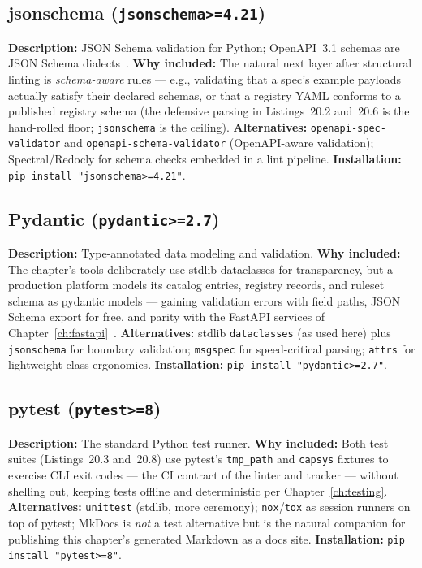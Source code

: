 \subsection{jsonschema (\texttt{jsonschema>=4.21})}
\textbf{Description:} JSON Schema validation for Python; OpenAPI~3.1
schemas are JSON Schema dialects~\cite{openapi31}.
\textbf{Why included:} The natural next layer after structural linting is
\emph{schema-aware} rules --- e.g., validating that a spec's example
payloads actually satisfy their declared schemas, or that a registry YAML
conforms to a published registry schema (the defensive parsing in
Listings~20.2 and~20.6 is the hand-rolled floor; \texttt{jsonschema} is
the ceiling).
\textbf{Alternatives:} \texttt{openapi-spec-validator} and
\texttt{openapi-schema-validator} (OpenAPI-aware validation);
Spectral/Redocly for schema checks embedded in a lint pipeline.
\textbf{Installation:} \texttt{pip install "jsonschema>=4.21"}.

\subsection{Pydantic (\texttt{pydantic>=2.7})}
\textbf{Description:} Type-annotated data modeling and validation.
\textbf{Why included:} The chapter's tools deliberately use stdlib
dataclasses for transparency, but a production platform models its
catalog entries, registry records, and ruleset schema as pydantic models
--- gaining validation errors with field paths, JSON Schema export for
free, and parity with the FastAPI services of
Chapter~\ref{ch:fastapi}~\cite{openapi31}.
\textbf{Alternatives:} stdlib \texttt{dataclasses} (as used here) plus
\texttt{jsonschema} for boundary validation; \texttt{msgspec} for
speed-critical parsing; \texttt{attrs} for lightweight class ergonomics.
\textbf{Installation:} \texttt{pip install "pydantic>=2.7"}.

\subsection{pytest (\texttt{pytest>=8})}
\textbf{Description:} The standard Python test runner.
\textbf{Why included:} Both test suites (Listings~20.3 and~20.8) use
pytest's \texttt{tmp\_path} and \texttt{capsys} fixtures to exercise CLI
exit codes --- the CI contract of the linter and tracker --- without
shelling out, keeping tests offline and deterministic per
Chapter~\ref{ch:testing}.
\textbf{Alternatives:} \texttt{unittest} (stdlib, more ceremony);
\texttt{nox}/\texttt{tox} as session runners on top of pytest; MkDocs is
\emph{not} a test alternative but is the natural companion for publishing
this chapter's generated Markdown as a docs site.
\textbf{Installation:} \texttt{pip install "pytest>=8"}.

